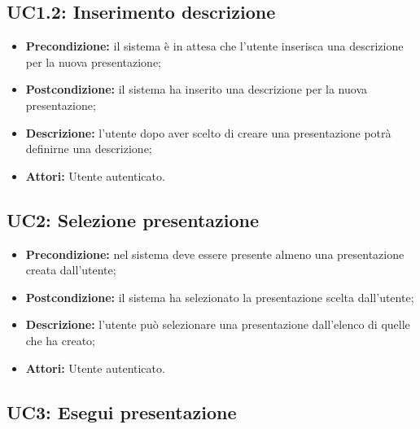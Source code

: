 \subsection{ UC1.2: Inserimento descrizione}

\begin{itemize}
	\item \textbf{Precondizione:} il sistema è in attesa che l'utente inserisca una descrizione per la nuova presentazione;
	\item \textbf{Postcondizione:} il sistema ha inserito una descrizione per la nuova presentazione;
	\item \textbf{Descrizione:} l'utente dopo aver scelto di creare una presentazione potrà definirne una descrizione;
	\item \textbf{Attori:} Utente autenticato.
\end{itemize}
\subsection{ UC2: Selezione presentazione}

\begin{itemize}
	\item \textbf{Precondizione:} nel sistema deve essere presente almeno una presentazione creata dall'utente;
	\item \textbf{Postcondizione:} il sistema ha selezionato la presentazione scelta dall'utente;
	\item \textbf{Descrizione:} l'utente può selezionare una presentazione dall'elenco di quelle che ha creato;
	\item \textbf{Attori:} Utente autenticato.
\end{itemize}
\subsection{ UC3: Esegui presentazione}

